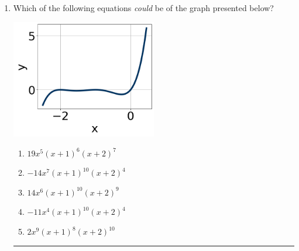 \documentclass[14pt]{extbook}
\newcommand{\litem}[1]{\item#1\hspace*{-1cm}\rule{\textwidth}{0.4pt}}
\begin{document}
\begin{enumerate}
{\begin{enumerate}[label=\Alph*.]
\end{enumerate} }
\litem{
Which of the following equations \textit{could} be of the graph presented below?
\begin{center}
    \includegraphics[width=0.5\textwidth]{../Figures/polyGraphToFunctionCopyC.png}
\end{center}
\begin{enumerate}[label=\Alph*.]
\item \( 19x^{5} (x + 1)^{6} (x + 2)^{7} \)
\item \( -14x^{7} (x + 1)^{10} (x + 2)^{4} \)
\item \( 14x^{6} (x + 1)^{10} (x + 2)^{9} \)
\item \( -11x^{4} (x + 1)^{10} (x + 2)^{4} \)
\item \( 2x^{9} (x + 1)^{8} (x + 2)^{10} \)


\end{enumerate}}
\end{enumerate}
\end{document}
